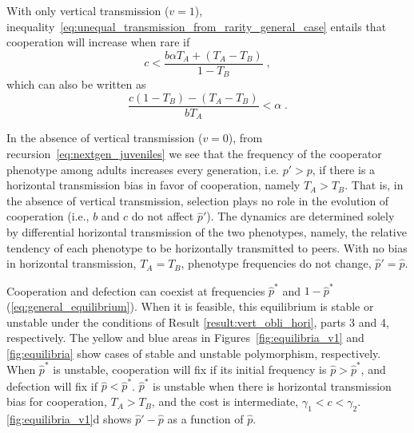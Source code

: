 \documentclass[12pt]{extarticle}
\begin{document}
With only vertical transmission ($v=1$), inequality~\ref{eq:unequal_transmission_from_rarity_general_case} entails that cooperation will increase when rare if
\begin{equation} \label{eq:vert_hori}
c < \frac{b \alpha T_A + (T_A - T_B)}{1-T_B} \;,
\end{equation} 
which can also be written as
\begin{equation} \label{eq:vert_hori_alpha}
\frac{c (1-T_B)-(T_A-T_B)}{b T_A} < \alpha \;.
\end{equation}

In the absence of vertical transmission ($v=0$), from recursion~\ref{eq:nextgen_juveniles} we see that the frequency of the cooperator phenotype among adults increases every generation, i.e. $p'>p$, if there is a horizontal transmission bias in favor of cooperation, namely $T_A > T_B$.  
That is, in the absence of vertical transmission, selection plays no role in the evolution of cooperation (i.e., $b$ and $c$ do not affect $\hat p'$).
The dynamics are determined solely by differential horizontal transmission of the two phenotypes, namely, the relative tendency of each phenotype to be horizontally transmitted to peers.
With no bias in horizontal transmission, $T_A = T_B$, phenotype frequencies do not change, $\hat p'=\hat p$.

Cooperation and defection can coexist at frequencies $\hat{p}^*$ and $1-\hat{p}^*$ (\autoref{eq:general_equilibrium}). 
When it is feasible, this equilibrium is stable or unstable under the conditions of Result \ref{result:vert_obli_hori}, parts 3 and 4, respectively. The yellow and blue areas in Figures~\ref{fig:equilibria_v1} and \ref{fig:equilibria} show cases of stable and unstable polymorphism, respectively.
When $\hat{p}^*$ is unstable, cooperation will fix if its initial frequency is $\hat{p}>\hat{p}^*$, and defection will fix if $\hat{p}<\hat{p}^*$.
$\hat{p}^*$ is unstable when there is horizontal transmission bias for cooperation, $T_A>T_B$, and the cost is intermediate, $\gamma_1 < c < \gamma_2$.
\autoref{fig:equilibria_v1}d shows $\hat{p}'-\hat{p}$ as a function of $\hat{p}$.


\end{document}
